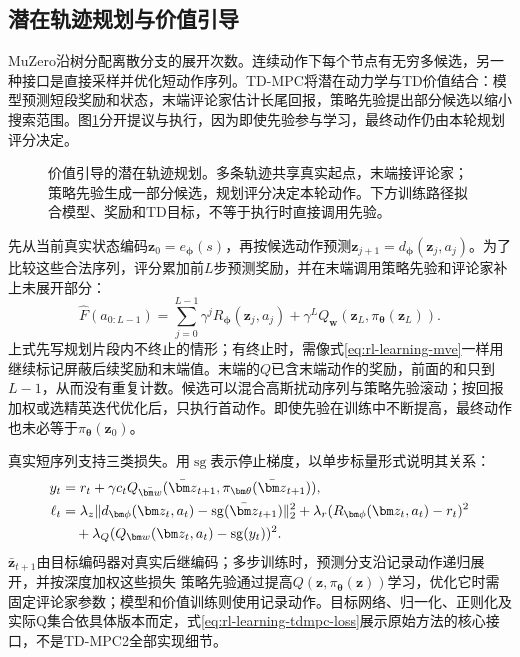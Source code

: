 \subsection{潜在轨迹规划与价值引导}
\label{sec:rl-learning-tdmpc}

MuZero沿树分配离散分支的展开次数。连续动作下每个节点有无穷多候选，另一种接口是直接采样并优化短动作序列。TD-MPC将潜在动力学与TD价值结合：模型预测短段奖励和状态，末端评论家估计长尾回报，策略先验提出部分候选以缩小搜索范围。图\ref{fig:rl-learning-tdmpc}分开提议与执行，因为即使先验参与学习，最终动作仍由本轮规划评分决定。

\begin{figure}[t]
  \centering
  
  \caption{价值引导的潜在轨迹规划。多条轨迹共享真实起点，末端接评论家；策略先验生成一部分候选，规划评分决定本轮动作。下方训练路径拟合模型、奖励和TD目标，不等于执行时直接调用先验。}
  \label{fig:rl-learning-tdmpc}
\end{figure}

先从当前真实状态编码$\bm z_0=e_{\bm\phi}(s)$，再按候选动作预测$\bm z_{j+1}=d_{\bm\phi}(\bm z_j,a_j)$。为了比较这些合法序列，评分累加前$L$步预测奖励，并在末端调用策略先验和评论家补上未展开部分：
\[
  \widehat F(a_{0:L-1})
  =\sum_{j=0}^{L-1}\gamma^j R_{\bm\phi}(\bm z_j,a_j)
      +\gamma^L Q_{\bm w}(\bm z_L,\pi_{\bm\theta}(\bm z_L)).
\]
上式先写规划片段内不终止的情形；有终止时，需像式\eqref{eq:rl-learning-mve}一样用继续标记屏蔽后续奖励和末端值。末端的$Q$已含末端动作的奖励，前面的和只到$L-1$，从而没有重复计数。候选可以混合高斯扰动序列与策略先验滚动；按回报加权或选精英迭代优化后，只执行首动作。即使先验在训练中不断提高，最终动作也未必等于$\pi_{\bm\theta}(\bm z_0)$。

真实短序列支持三类损失。用$\operatorname{sg}$表示停止梯度，以单步标量形式说明其关系：
\begin{align}
  y_t&=r_t+\gamma c_t
      Q_{\bar{\bm w}}(\bar{\bm z}_{t+1},
                             \pi_{\bm\theta}(\bar{\bm z}_{t+1})), \notag\\
  \ell_t&=\lambda_z\|
        d_{\bm\phi}(\bm z_t,a_t)-\operatorname{sg}(\bar{\bm z}_{t+1})
                              \|_2^2
       +\lambda_r(R_{\bm\phi}(\bm z_t,a_t)-r_t)^2 \notag\\
       &\quad+\lambda_Q(Q_{\bm w}(\bm z_t,a_t)
                                      -\operatorname{sg}(y_t))^2.
  \label{eq:rl-learning-tdmpc-loss}
\end{align}
$\bar{\bm z}_{t+1}$由目标编码器对真实后继编码；多步训练时，预测分支沿记录动作递归展开，并按深度加权这些损失
策略先验通过提高$Q(\bm z,\pi_{\bm\theta}(\bm z))$学习，优化它时需固定评论家参数；模型和价值训练则使用记录动作。目标网络、归一化、正则化及实际Q集合依具体版本而定，式\eqref{eq:rl-learning-tdmpc-loss}展示原始方法的核心接口，不是TD-MPC2全部实现细节。

